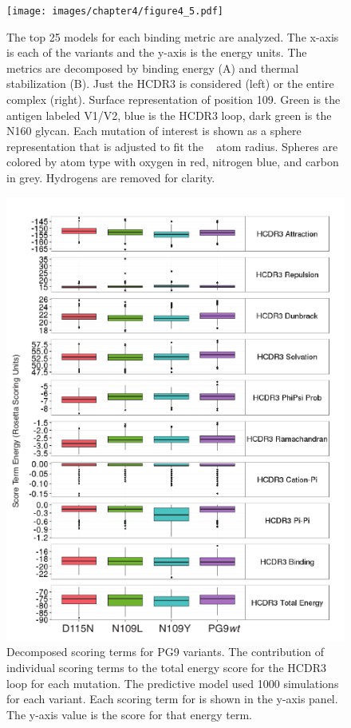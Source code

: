 \begin{figure}[!t]
   \centering
   \texttt{[image: images/chapter4/figure4\_5.pdf]} %
   \caption[Predictive Models of PG9 Variants that Enhanced Binding]{The top 25 models for each binding metric are analyzed. The x-axis is each of the variants and the y-axis is the \rosetta energy units. The metrics are decomposed by binding energy (A) and thermal stabilization (B). Just the HCDR3 is considered (left) or the entire complex (right). Surface representation of position 109. Green is the antigen labeled V1/V2, blue is the HCDR3 loop, dark green is the N160 glycan. Each mutation of interest is shown as a sphere representation that is adjusted to fit the \rosetta~ atom radius. Spheres are colored by atom type with oxygen in red, nitrogen blue, and carbon in grey. Hydrogens are removed for clarity.}
   \label{fig:figure4_5}
\end{figure}


\begin{figure}[!t]
   \centering
   \includegraphics[scale=1.4]{images/chapter4/figure4_6.pdf} %
   \caption[Decomposed Scoring Terms for PG9 Variants]{Decomposed scoring terms for PG9 variants. The contribution of individual scoring terms to the total energy score for the HCDR3 loop for each mutation. The predictive model used 1000 simulations for each variant. Each scoring term for \rosetta is shown in the y-axis panel. The y-axis value is the score for that energy term.}
   \label{fig:figure4_6}
\end{figure}


